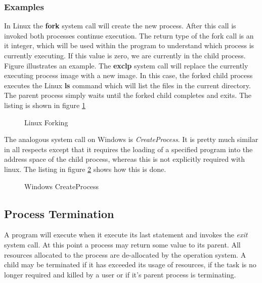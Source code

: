 \documentclass[10pt,a4paper]{article}
\begin{document}
\subsubsection{Examples}
In Linux the {\bf fork} system call will create the new process. After this call is invoked both processes continue execution. The return type of the fork call is an it integer, which will be used within the program to understand which process is currently executing. If this value is zero, we are currently in the child process. Figure \cite{fork} illustrates an example. The {\bf exclp} system call will replace the currently executing process image with a new image. In this case, the forked child process executes the Linux {\bf ls} command which will list the files in the current directory. The parent process simply waits until the forked child completes and exits. The listing is shown in figure \ref{linuxfork}

\begin{figure}
\caption{Linux Forking \cite{OSCONCEPTS}}
\begin{center}

\label{linuxfork}
\end{center}
\end{figure}
The analogous system call on Windows is {\it CreateProcess}. It is pretty much similar in all respects except that it requires the loading of a specified program into the address space of the child process, whereas this is not explicitly required with linux. The listing in figure \ref{windowscreateprocess} shows how this is done.  

\begin{figure}
\caption{Windows CreateProcess\cite{OSCONCEPTS}}
\begin{center}

\label{windowscreateprocess}
\end{center}
\end{figure}

\subsection{Process Termination}
A program will execute when it execute its last statement and invokes the {\it exit} system call. At this point a process may return some value to its parent. All resources allocated to the process are de-allocated by the operation system. A child may be terminated if it has exceeded its usage of resources, if the task is no longer required and killed by a user or if it's parent process is terminating. 
\end{document}
